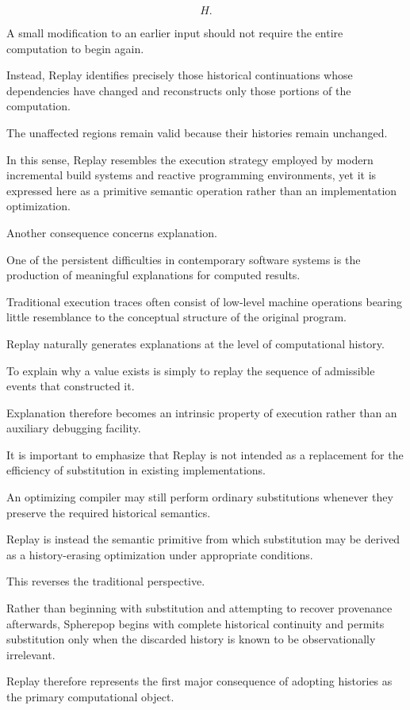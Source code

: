 \documentclass[12pt,oneside]{article}
\theoremstyle{definition}
\theoremstyle{remark}
\begin{document}
\[
H.
\]

A small modification to an earlier input should not require the entire
computation to begin again.

Instead, Replay identifies precisely those historical continuations whose
dependencies have changed and reconstructs only those portions of the
computation.

The unaffected regions remain valid because their histories remain unchanged.

In this sense, Replay resembles the execution strategy employed by modern
incremental build systems and reactive programming environments, yet it is
expressed here as a primitive semantic operation rather than an implementation
optimization.

Another consequence concerns explanation.

One of the persistent difficulties in contemporary software systems is the
production of meaningful explanations for computed results.

Traditional execution traces often consist of low-level machine operations
bearing little resemblance to the conceptual structure of the original
program.

Replay naturally generates explanations at the level of computational history.

To explain why a value exists is simply to replay the sequence of admissible
events that constructed it.

Explanation therefore becomes an intrinsic property of execution rather than
an auxiliary debugging facility.

It is important to emphasize that Replay is not intended as a replacement for
the efficiency of substitution in existing implementations.

An optimizing compiler may still perform ordinary substitutions whenever they
preserve the required historical semantics.

Replay is instead the semantic primitive from which substitution may be
derived as a history-erasing optimization under appropriate conditions.

This reverses the traditional perspective.

Rather than beginning with substitution and attempting to recover provenance
afterwards, Spherepop begins with complete historical continuity and permits
substitution only when the discarded history is known to be observationally
irrelevant.

Replay therefore represents the first major consequence of adopting histories
as the primary computational object.
\end{document}
